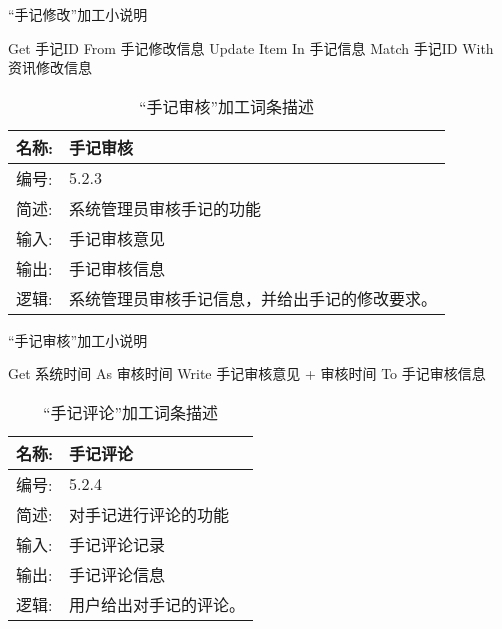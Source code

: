 \begin{algorithm}[H] 
    \renewcommand{\thealgorithm}{}
    \caption{“手记修改”加工小说明} 
    \label{alg3} 
    \begin{algorithmic}[1]
        \STATE Get 手记ID From 手记修改信息
        \STATE Update Item In 手记信息 Match 手记ID With 资讯修改信息
    \end{algorithmic} 
\end{algorithm}

\begin{table}[H]  
\caption{“手记审核”加工词条描述}  
\begin{center}  
    \begin{tabular}{l p{11cm}} 
        \hline
        \quad 名称:  &  手记审核 \\
        \hline
        \quad 编号:  & 5.2.3 \\
        \hline
        \quad 简述:  & 系统管理员审核手记的功能 \\
        \hline
        \quad 输入:  & 手记审核意见 \\
        \hline
        \quad 输出:  & 手记审核信息 \\
        \hline
        \quad 逻辑:  & 系统管理员审核手记信息，并给出手记的修改要求。 \\
        \hline
    \end{tabular}
    \label{tab1}
\end{center}
\end{table}

\begin{algorithm}[H]
    \renewcommand{\thealgorithm}{}
    \caption{“手记审核”加工小说明} 
    \label{alg3} 
    \begin{algorithmic}[1]
        \STATE Get 系统时间 As 审核时间
        \STATE Write 手记审核意见 + 审核时间 To 手记审核信息
    \end{algorithmic} 
\end{algorithm}

\begin{table}[H]  
\caption{“手记评论”加工词条描述}  
\begin{center}  
    \begin{tabular}{l p{11cm}} 
        \hline
        \quad 名称:  &  手记评论 \\
        \hline
        \quad 编号:  & 5.2.4 \\
        \hline
        \quad 简述:  & 对手记进行评论的功能 \\
        \hline
        \quad 输入:  & 手记评论记录 \\
        \hline
        \quad 输出:  & 手记评论信息 \\
        \hline
        \quad 逻辑:  & 用户给出对手记的评论。 \\
        \hline
    \end{tabular}
    \label{tab1}
\end{center}
\end{table}

